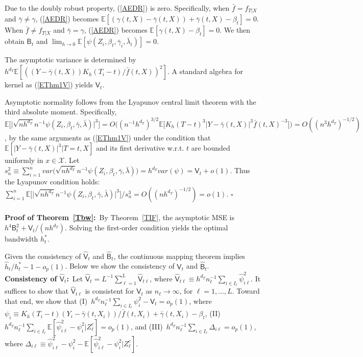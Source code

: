 \documentclass[lettersize, 12pt]{article}
\begin{document}
Due to the doubly robust property, (\ref{AEDR}) is zero.
Specifically, when $\bar f = f_{T|X}$ and $\bar \gamma \neq \gamma$, (\ref{AEDR}) becomes 
$\mathbb{E}\left[\left(\gamma(t,X) - \bar\gamma(t,X)\right) + \bar\gamma(t, X) - \beta_t\right] = 0$.
When $\bar f \neq f_{T|X}$ and $\bar \gamma = \gamma$, (\ref{AEDR}) becomes 
$\mathbb{E}\left[
\gamma(t, X) - \beta_t
\right] = 0$.
We then obtain $\mathsf{B}_t$ and $\lim_{h\rightarrow 0}\mathbb{E}[\psi(Z_i, \beta_t, \bar \gamma_i, \bar \lambda_i) ] = 0$.


The asymptotic variance is determined by $h^{d_T}\mathbb{E}\left[ \left( (Y-\bar{\gamma}(t, X))K_h(T_i - t)/\bar f(t,X) \right)^2\right]$.
A standard algebra for kernel as (\ref{EThm1V}) yields $\mathsf{V}_t$. 


Asymptotic normality follows from the Lyapunov central limit theorem with the third absolute moment.
Specifically,  
$\mathbb{E}\big[\big|\sqrt{nh^{d_T}}n^{-1}\psi(Z_i, \beta_t, \bar\gamma,\bar \lambda)\big|^3\big]
= O\big((n^{-1}h^{d_T})^{3/2}\mathbb{E}\big[
K_h(T-t)^3 |Y-\bar{\gamma}(t,X)|^3 \bar f(t,X)^{-3}
\big]
\big)
= O((n^3h^{d_T})^{-1/2})$, by the same arguments as (\ref{EThm1V}) 
under the condition that $\mathbb{E}[|Y-\bar{\gamma}(t,X)|^3|T=t, X]$ and its first derivative w.r.t. $t$ are bounded uniformly in $x\in\mathcal{X}$.
Let $s_n^2 \equiv \sum_{i=1}^n var\big( \sqrt{nh^{d_T}}n^{-1}\psi(Z_i, \beta_t, \bar\gamma, \bar\lambda)\big)
 = h^{d_T} var(\psi) = \mathsf{V}_t + o(1)$.
Thus the Lyapunov condition holds: $\sum_{i=1}^n\mathbb{E}\big[\big|\sqrt{nh^{d_T}}n^{-1}\psi(Z_i, \beta_t, \bar\gamma, \bar\lambda)\big|^3\big]/s_n^3 = O((nh^{d_T})^{-1/2}) = o(1)$.
\hfill $\square$
\\ \\
\textbf{Proof of Theorem~\ref{Tbw}:}\
By Theorem~\ref{TIF}, the asymptotic MSE is $h^4\mathsf{B}_t^2 + \mathsf{V}_t/(nh^{d_T})$.
Solving the first-order condition yields the optimal bandwidth $h_t^\ast$.  

Given the consistency of $\hat{\mathsf{V}}_t$ and $\hat{\mathsf{B}}_t$, the continuous mapping theorem implies 
$\hat h_t/h_t^\ast - 1 - o_p(1)$.
Below we show the consistency of $\hat{\mathsf{V}}_t$ and $\hat{\mathsf{B}}_t$.
\\[3pt] 
\textbf{Consistency of $\hat{\mathsf{V}}_t$:}\
Let $\hat{\mathsf{V}}_{t} = L^{-1}\sum_{\ell=1}^L\hat{\mathsf{V}}_{t\ell}$, where $\hat{\mathsf{V}}_{t\ell} \equiv h^{d_T} n_\ell^{-1} \sum_{i \in I_\ell} \hat \psi_{i\ell}^2$.
It suffices to show that $\hat{\mathsf{V}}_{t\ell}$ is consistent for $\mathsf{V}_{t}$ as $n_\ell\rightarrow\infty$, for $\ell=1,..., L$.
Toward that end, 
we show that 
(I)~$h^{d_T} n_\ell^{-1} \sum_{i \in I_\ell} \psi_{i}^2 - {\mathsf{V}}_{t} = o_p(1)$,
where $\psi_{i} \equiv K_h(T_i-t) (Y_i - \bar \gamma(t,X_i) )/\bar f(t,X_i) +  \bar \gamma(t,X_i) - \beta_t$,
(II)~$h^{d_T} n_\ell^{-1} \sum_{i \in I_\ell} \mathbb{E}[\hat \psi_{i\ell}^2 - \psi_{i}^2|Z_\ell^c] = o_p(1)$,
and (III)~$h^{d_T} n_\ell^{-1} \sum_{i \in I_\ell} \Delta_{i\ell} = o_p(1)$, 
where $\Delta_{i\ell} \equiv \hat \psi_{i\ell}^2 - \psi_{i}^2 - \mathbb{E}[\hat \psi_{i\ell}^2 - \psi_{i}^2|Z_\ell^c]$.
\end{document}
